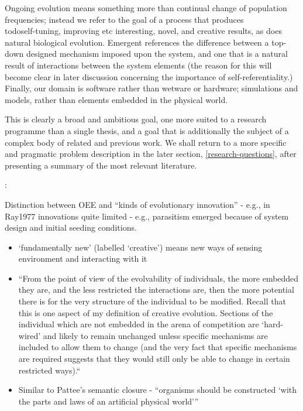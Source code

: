 Ongoing evolution means something more than continual change of population frequencies; instead we refer to the goal of a process that produces \\todo{self-tuning, improving etc} interesting, novel, and creative results, as does natural biological evolution. Emergent references the difference between a top-down designed mechanism imposed upon the system, and one that is a natural result of interactions between the system elements (the reason for this will become clear in later discussion concerning the importance of self-referentiality.) Finally, our domain is software rather than wetware or hardware; simulations and models, rather than elements embedded in the physical world.

This is clearly a broad and ambitious goal, one more suited to a research programme than a single thesis, and a goal that is additionally the subject of a complex body of related and previous work. We shall return to a more specific and pragmatic problem description in the later section, \ref{research-questions}, after presenting a summary of the most relevant literature.

\autocite{Taylor2001}:

	Distinction between OEE and ``kinds of evolutionary innovation'' -
	e.g., in Ray1977 innovations quite limited - e.g., parasitism emerged
	because of system design and initial seeding conditions.
	
	\begin{itemize}
		\item
		
		`fundamentally new' (labelled `creative') means new ways of sensing
		environment and interacting with it
		
		\item
		
		``From the point of view of the evolvability of individuals, the
		more embedded they are, and the less restricted the interactions
		are, then the more potential there is for the very structure of the
		individual to be modified. Recall that this is one aspect of my
		definition of creative evolution. Sections of the individual which
		are not embedded in the arena of competition are `hard-wired' and
		likely to remain unchanged unless specific mechanisms are included
		to allow them to change (and the very fact that specific mechanisms
		are required suggests that they would still only be able to change
		in certain restricted ways).``
		
		\item
		
		Similar to Pattee's semantic closure - ``organisms should be
		constructed `with the parts and laws of an artificial physical
		world'''
		
	\end{itemize}
